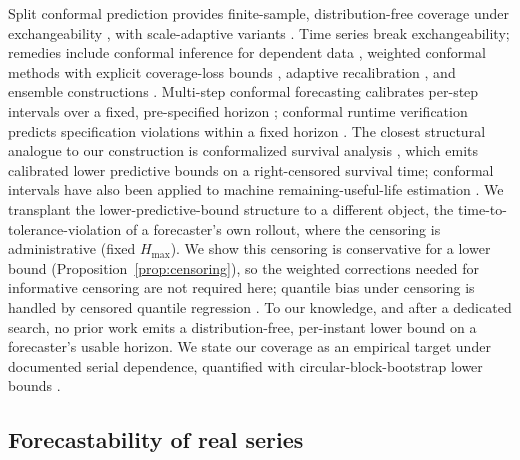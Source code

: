 \documentclass[aps,pre,twocolumn,superscriptaddress,nofootinbib,longbibliography]{revtex4-2}
\newcommand{\Hmax}{H_{\max}}
\begin{document}
Split conformal prediction provides finite-sample, distribution-free
coverage under exchangeability
\citep{vovk2005algorithmic,papadopoulos2002inductive,lei2018distributionfree},
with scale-adaptive variants \citep{romano2019cqr}. Time series break
exchangeability; remedies include conformal inference for dependent data
\citep{chernozhukov2018exact}, weighted conformal methods with explicit
coverage-loss bounds \citep{barber2023conformal}, adaptive recalibration
\citep{gibbs2021adaptive}, and ensemble constructions
\citep{xu2021conformal}. Multi-step conformal forecasting calibrates
per-step intervals over a fixed, pre-specified horizon
\citep{stankeviciute2021conformal,sun2024copula}; conformal runtime
verification predicts specification violations within a fixed horizon
\citep{lindemann2023stl}. The closest structural analogue to our
construction is conformalized survival analysis
\citep{candes2023conformalized,gui2024conformalized,sesia2024doubly},
which emits calibrated lower predictive bounds on a right-censored
survival time; conformal intervals have also been applied to machine
remaining-useful-life estimation \citep{javanmardi2023conformal}. We
transplant the lower-predictive-bound structure to a different object,
the time-to-tolerance-violation of a forecaster's own rollout, where the
censoring is administrative (fixed $\Hmax$). We show this censoring is
conservative for a lower bound (Proposition~\ref{prop:censoring}), so the
weighted corrections needed for informative censoring are not required
here; quantile bias under censoring is handled by censored quantile
regression \citep{powell1986censored}. To our knowledge, and after a
dedicated search, no prior work emits a distribution-free, per-instant
lower bound on a forecaster's usable horizon. We state our coverage as an
empirical target under documented serial dependence, quantified with
circular-block-bootstrap lower bounds
\citep{kunsch1989jackknife,politis1992circular}.

\subsection{Forecastability of real series}
\end{document}
